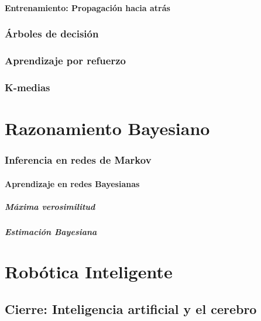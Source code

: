 \documentclass[12pt,openany]{book}
\begin{document}
\subsection{Entrenamiento: Propagación hacia atrás}

\section{Árboles de decisión}
\section{Aprendizaje por refuerzo}
\section{K-medias}


\part{Razonamiento Bayesiano}







\section{Inferencia en redes de Markov}

\subsection{Aprendizaje en redes Bayesianas}
\subsubsection{Máxima verosimilitud}
\subsubsection{Estimación Bayesiana}


\part{Robótica Inteligente}
\chapter{Cierre: Inteligencia artificial y el cerebro}

\backmatter

\printbibliography[heading=bibintoc]
\end{document}

